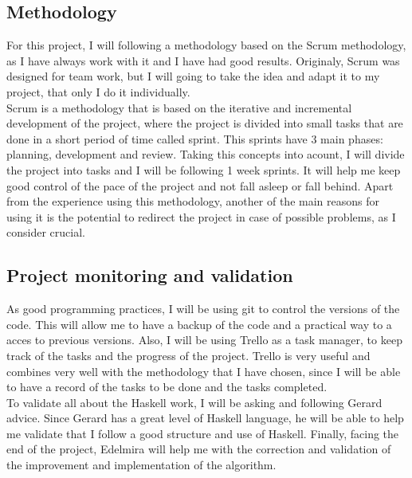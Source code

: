 \subsection{Methodology}
For this project, I will following a methodology based on the Scrum methodology, as I have always work with it and I have had good results.
Originaly, Scrum \cite{noauthor_what_nodate} was designed for team work, but I will going to take the idea and adapt it to my project, that only I do it individually. \\

Scrum is a methodology that is based on the iterative and incremental development of the project, where the project is divided into small tasks that are done in a short period of time called sprint.
This sprints have 3 main phases: planning, development and review.
Taking this concepts into acount, I will divide the project into tasks and I will be following 1 week sprints.
It will help me keep good control of the pace of the project and not fall asleep or fall behind.
Apart from the experience using this methodology, another of the main reasons for using it is the potential to redirect the project in case of possible problems, as I consider crucial.
\subsection{Project monitoring and validation}
As good programming practices, I will be using git \cite{noauthor_git_nodate} to control the versions of the code.
This will allow me to have a backup of the code and a practical way to a acces to previous versions.
Also, I will be using Trello as a task manager, to keep track of the tasks and the progress of the project.
Trello is very useful and combines very well with the methodology that I have chosen, since I will be able to have a record of the tasks to be done and the tasks completed. \\

To validate all about the Haskell work, I will be asking and following Gerard advice. 
Since Gerard has a great level of Haskell language, he will be able to help me validate that I follow a good structure and use of Haskell.
Finally, facing the end of the project, Edelmira will help me with the correction and validation of the improvement and implementation of the algorithm.





